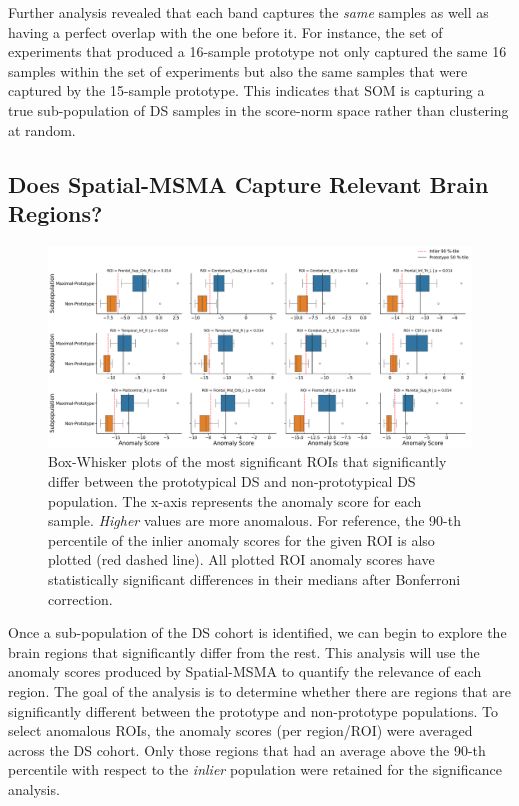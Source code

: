 Further analysis revealed that each band captures the \textit{same} samples as well as having a perfect overlap with the one before it. For instance, the set of experiments that produced a 16-sample prototype not only captured the same 16 samples within the set of experiments but also the same samples that were captured by the 15-sample prototype. This indicates that SOM is capturing a true sub-population of DS samples in the score-norm space rather than clustering at random.




\subsection*{Does Spatial-MSMA Capture Relevant Brain Regions?}

\begin{figure}[tbhp]
\centering
\includegraphics[width=\textwidth]{figures/roi_boxplot.pdf}
\caption{Box-Whisker plots of the most significant ROIs that significantly differ between the prototypical DS and non-prototypical DS population. The x-axis represents the anomaly score for each sample. \textit{Higher} values are more anomalous. For reference, the 90-th percentile of the inlier anomaly scores for the given ROI is also plotted (red dashed line). All plotted ROI anomaly scores have statistically significant differences in their medians after Bonferroni correction. }
\label{fig:roi-box-ds}
\end{figure}


Once a sub-population of the DS cohort is identified, we can begin to explore the brain regions that significantly differ from the rest.  This analysis will use the anomaly scores produced by Spatial-MSMA to quantify the relevance of each region. The goal of the analysis is to determine whether there are regions that are significantly different between the prototype and non-prototype populations. To select anomalous ROIs, the anomaly scores (per region/ROI) were averaged across the DS cohort. Only those regions that had an average above the 90-th percentile with respect to the \textit{inlier} population were retained for the significance analysis.

